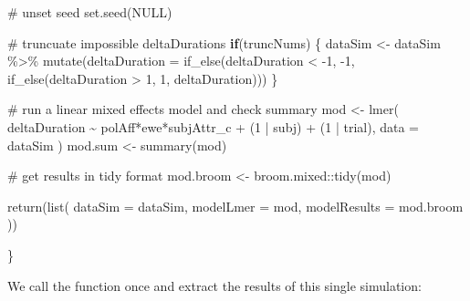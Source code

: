 \documentclass[
  letterpaper,
  DIV=11,
  numbers=noendperiod]{scrartcl}
\newenvironment{Shaded}{\begin{snugshade}}{\end{snugshade}}
\newcommand{\AttributeTok}[1]{\textcolor[rgb]{0.40,0.45,0.13}{#1}}
\newcommand{\CommentTok}[1]{\textcolor[rgb]{0.37,0.37,0.37}{#1}}
\newcommand{\ConstantTok}[1]{\textcolor[rgb]{0.56,0.35,0.01}{#1}}
\newcommand{\ControlFlowTok}[1]{\textcolor[rgb]{0.00,0.23,0.31}{\textbf{#1}}}
\newcommand{\DecValTok}[1]{\textcolor[rgb]{0.68,0.00,0.00}{#1}}
\newcommand{\FunctionTok}[1]{\textcolor[rgb]{0.28,0.35,0.67}{#1}}
\newcommand{\NormalTok}[1]{\textcolor[rgb]{0.00,0.23,0.31}{#1}}
\newcommand{\OtherTok}[1]{\textcolor[rgb]{0.00,0.23,0.31}{#1}}
\newcommand{\SpecialCharTok}[1]{\textcolor[rgb]{0.37,0.37,0.37}{#1}}
\begin{document}
\begin{Shaded}
\begin{Highlighting}[]
  \CommentTok{\# unset seed}
  \FunctionTok{set.seed}\NormalTok{(}\ConstantTok{NULL}\NormalTok{)}
  
  \CommentTok{\# truncuate impossible deltaDurations}
  \ControlFlowTok{if}\NormalTok{(truncNums) \{}
\NormalTok{    dataSim }\OtherTok{\textless{}{-}}\NormalTok{ dataSim }\SpecialCharTok{\%\textgreater{}\%} 
      \FunctionTok{mutate}\NormalTok{(}\AttributeTok{deltaDuration =} \FunctionTok{if\_else}\NormalTok{(deltaDuration }\SpecialCharTok{\textless{}} \SpecialCharTok{{-}}\DecValTok{1}\NormalTok{, }\SpecialCharTok{{-}}\DecValTok{1}\NormalTok{,}
        \FunctionTok{if\_else}\NormalTok{(deltaDuration }\SpecialCharTok{\textgreater{}} \DecValTok{1}\NormalTok{, }\DecValTok{1}\NormalTok{, deltaDuration)))}
\NormalTok{  \}}
  
  \CommentTok{\# run a linear mixed effects model and check summary}
\NormalTok{  mod }\OtherTok{\textless{}{-}} \FunctionTok{lmer}\NormalTok{(}
\NormalTok{    deltaDuration }\SpecialCharTok{\textasciitilde{}}\NormalTok{ polAff}\SpecialCharTok{*}\NormalTok{ewe}\SpecialCharTok{*}\NormalTok{subjAttr\_c }\SpecialCharTok{+}\NormalTok{ (}\DecValTok{1} \SpecialCharTok{|}\NormalTok{ subj) }\SpecialCharTok{+}\NormalTok{ (}\DecValTok{1} \SpecialCharTok{|}\NormalTok{ trial),}
    \AttributeTok{data =}\NormalTok{ dataSim}
\NormalTok{  )}
\NormalTok{  mod.sum }\OtherTok{\textless{}{-}} \FunctionTok{summary}\NormalTok{(mod)}

  \CommentTok{\# get results in tidy format}
\NormalTok{  mod.broom }\OtherTok{\textless{}{-}}\NormalTok{ broom.mixed}\SpecialCharTok{::}\FunctionTok{tidy}\NormalTok{(mod)}

  \FunctionTok{return}\NormalTok{(}\FunctionTok{list}\NormalTok{(}
    \AttributeTok{dataSim =}\NormalTok{ dataSim,}
    \AttributeTok{modelLmer =}\NormalTok{ mod,}
    \AttributeTok{modelResults =}\NormalTok{ mod.broom}
\NormalTok{  ))}
  
\NormalTok{\}}
\end{Highlighting}
\end{Shaded}

We call the function once and extract the results of this single
simulation:
\end{document}
